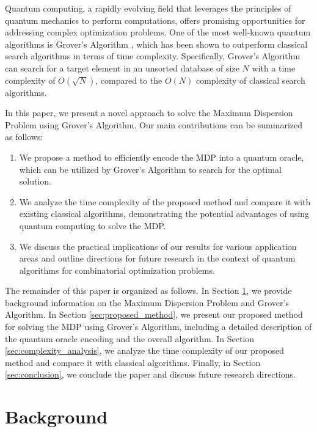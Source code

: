 Quantum computing, a rapidly evolving field that leverages the principles of quantum mechanics to perform computations, offers promising opportunities for addressing complex optimization problems. One of the most well-known quantum algorithms is Grover's Algorithm \cite{grover1996fast}, which has been shown to outperform classical search algorithms in terms of time complexity. Specifically, Grover's Algorithm can search for a target element in an unsorted database of size $N$ with a time complexity of $O(\sqrt{N})$, compared to the $O(N)$ complexity of classical search algorithms.

In this paper, we present a novel approach to solve the Maximum Dispersion Problem using Grover's Algorithm. Our main contributions can be summarized as follows:

\begin{enumerate}
    \item We propose a method to efficiently encode the MDP into a quantum oracle, which can be utilized by Grover's Algorithm to search for the optimal solution.
    
    \item We analyze the time complexity of the proposed method and compare it with existing classical algorithms, demonstrating the potential advantages of using quantum computing to solve the MDP.
    
    \item We discuss the practical implications of our results for various application areas and outline directions for future research in the context of quantum algorithms for combinatorial optimization problems.
\end{enumerate}

The remainder of this paper is organized as follows. In Section \ref{sec:background}, we provide background information on the Maximum Dispersion Problem and Grover's Algorithm. In Section \ref{sec:proposed_method}, we present our proposed method for solving the MDP using Grover's Algorithm, including a detailed description of the quantum oracle encoding and the overall algorithm. In Section \ref{sec:complexity_analysis}, we analyze the time complexity of our proposed method and compare it with classical algorithms. Finally, in Section \ref{sec:conclusion}, we conclude the paper and discuss future research directions.

\section{Background}
\label{sec:background}

